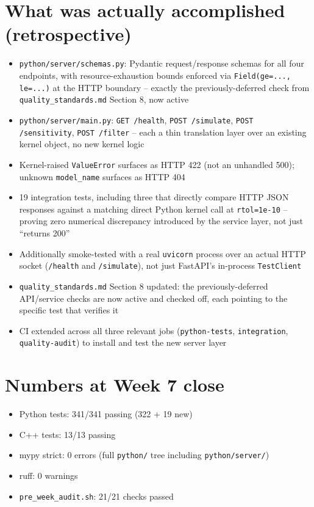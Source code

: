 \documentclass[11pt]{article}
\begin{document}
\section*{What was actually accomplished (retrospective)}

\begin{itemize}[leftmargin=*]
  \item \texttt{python/server/schemas.py}: Pydantic request/response
    schemas for all four endpoints, with resource-exhaustion bounds
    enforced via \texttt{Field(ge=..., le=...)} at the HTTP boundary
    -- exactly the previously-deferred check from
    \texttt{quality\_standards.md} Section 8, now active
  \item \texttt{python/server/main.py}: \texttt{GET /health},
    \texttt{POST /simulate}, \texttt{POST /sensitivity},
    \texttt{POST /filter} -- each a thin translation layer over an
    existing kernel object, no new kernel logic
  \item Kernel-raised \texttt{ValueError} surfaces as HTTP 422 (not an
    unhandled 500); unknown \texttt{model\_name} surfaces as HTTP 404
  \item 19 integration tests, including three that directly compare
    HTTP JSON responses against a matching direct Python kernel call
    at \texttt{rtol=1e-10} -- proving zero numerical discrepancy
    introduced by the service layer, not just ``returns 200''
  \item Additionally smoke-tested with a real \texttt{uvicorn} process
    over an actual HTTP socket (\texttt{/health} and \texttt{/simulate}),
    not just FastAPI's in-process \texttt{TestClient}
  \item \texttt{quality\_standards.md} Section 8 updated: the
    previously-deferred API/service checks are now active and checked
    off, each pointing to the specific test that verifies it
  \item CI extended across all three relevant jobs
    (\texttt{python-tests}, \texttt{integration}, \texttt{quality-audit})
    to install and test the new server layer
\end{itemize}

\section*{Numbers at Week 7 close}
\begin{itemize}[leftmargin=*]
  \item Python tests: 341/341 passing (322 + 19 new)
  \item C++ tests: 13/13 passing
  \item mypy strict: 0 errors (full \texttt{python/} tree including
    \texttt{python/server/})
  \item ruff: 0 warnings
  \item \texttt{pre\_week\_audit.sh}: 21/21 checks passed
\end{itemize}
\end{document}
